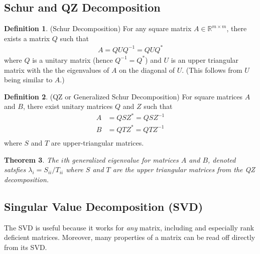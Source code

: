 \documentclass[12pt]{book}
\numberwithin{equation}{section} %
\theoremstyle{plain}
\newtheorem{thm}{Theorem}[section]
\theoremstyle{definition}
\newtheorem{defn}[thm]{Definition}
\theoremstyle{remark}
\newcommand{\Rmm}{\mathbb{R}^{m\times m}}
\begin{document}
\subsection{Schur and QZ Decomposition}

\begin{defn}{(Schur Decomposition)}
For any square matrix $A\in\Rmm$, there exists a matrix $Q$ such that
\begin{align*}
  A = Q U Q^{-1} = Q U Q^*
\end{align*}
where $Q$ is a unitary matrix (hence $Q^{-1} = Q^*$) and $U$ is an upper
triangular matrix with the the eigenvalues of $A$ on the diagonal of
$U$. (This follows from $U$ being similar to $A$.)
\end{defn}

\begin{defn}{(QZ or Generalized Schur Decomposition)}
For square matrices $A$ and $B$, there exist unitary matrices $Q$ and
$Z$ such that
\begin{align*}
  A &= Q S Z^* = QSZ^{-1} \\
  B &= Q T Z^* = QTZ^{-1} \\
\end{align*}
where $S$ and $T$ are upper-triangular matrices.
\end{defn}

\begin{thm}
The $i$th generalized eigenvalue for matrices $A$ and $B$, denoted
satsfies $\lambda_i = S_{ii} / T_{ii}$ where $S$ and $T$ are the upper
triangular matrices from the QZ decomposition.
\end{thm}


\subsection{Singular Value Decomposition (SVD)}

The SVD is  useful because it works for \emph{any} matrix, including and
especially rank deficient matrices. Moreover, many properties of a
matrix can be read off directly from its SVD.
\end{document}
